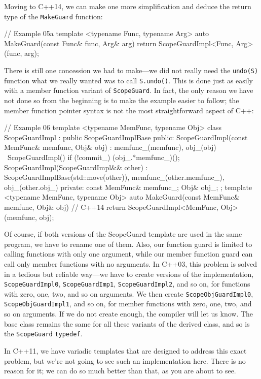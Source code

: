 Moving to C++14, we can make one more simplification and deduce the return type of the \texttt{MakeGuard} function:

\begin{code}
// Example 05a
template <typename Func, typename Arg>
auto MakeGuard(const Func& func, Arg& arg) {
  return ScopeGuardImpl<Func, Arg>(func, arg);
}
\end{code}

There is still one concession we had to make---we did not really need the \texttt{undo(S)} function what we really wanted was to call \texttt{S.undo()}. This is done just as easily with a member function variant of \texttt{ScopeGuard}. In fact, the only reason we have not done so from the beginning is to make the example easier to follow; the member function pointer syntax is not the most straightforward aspect of C++:

\begin{code}
// Example 06
template <typename MemFunc, typename Obj>
class ScopeGuardImpl : public ScopeGuardImplBase {
  public:
  ScopeGuardImpl(const MemFunc& memfunc, Obj& obj) :
    memfunc_(memfunc), obj_(obj) {}
  ~ScopeGuardImpl() { if (!commit_) (obj_.*memfunc_)(); }
  ScopeGuardImpl(ScopeGuardImpl&& other) :
    ScopeGuardImplBase(std::move(other)),
    memfunc_(other.memfunc_),
    obj_(other.obj_) {}
  private:
  const MemFunc& memfunc_; Obj& obj_;
};
template <typename MemFunc, typename Obj>
auto MakeGuard(const MemFunc& memfunc, Obj& obj) {// C++14
  return ScopeGuardImpl<MemFunc, Obj>(memfunc, obj);
}
\end{code}

Of course, if both versions of the ScopeGuard template are used in the same program, we have to rename one of them. Also, our function guard is limited to calling functions with only one argument, while our member function guard can call only member functions with no arguments. In C++03, this problem is solved in a tedious but reliable way---we have to create versions of the implementation, \texttt{ScopeGuardImpl0}, \texttt{ScopeGuardImp1}, \texttt{ScopeGuardImpl2}, and so on, for functions with zero, one, two, and so on arguments. We then create \texttt{ScopeObjGuardImpl0}, \texttt{ScopeObjGuardImpl1}, and so on, for member functions with zero, one, two, and so on arguments. If we do not create enough, the compiler will let us know. The base class remains the same for all these variants of the derived class, and so is the \texttt{ScopeGuard} \texttt{typedef}.

In C++11, we have variadic templates that are designed to address this exact problem, but we're not going to see such an implementation here. There is no reason for it; we can do so much better than that, as you are about to see.

